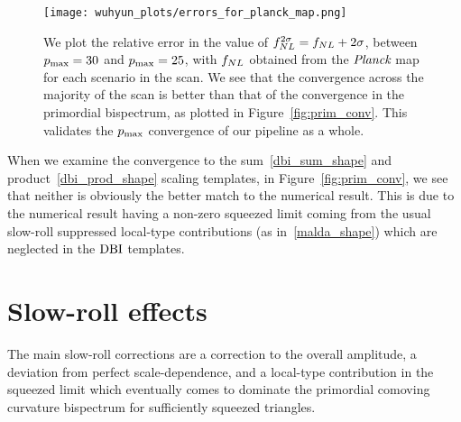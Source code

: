 \begin{figure}[h!]
\centering
\texttt{[image: wuhyun\_plots/errors\_for\_planck\_map.png]}
\caption{
    We plot the relative error in the value of $f_{NL}^{2\sigma}=f_{NL}+2\sigma$,
    between $p_\text{max}=30$ and $p_\text{max}=25$,
    with $f_{NL}$ obtained from the $\textit{Planck}$ map for each scenario in the scan.
    We see that the convergence across the majority of the scan is better than that of the
    convergence in the primordial bispectrum, as plotted in Figure~\ref{fig:prim_conv}.
    This validates the $p_\text{max}$ convergence of our pipeline as a whole.
}\label{fig:cmb_conv}
\end{figure}


    When we examine the convergence to the sum~\eqref{dbi_sum_shape}
    and product~\eqref{dbi_prod_shape} scaling templates,
    in Figure~\ref{fig:prim_conv},
    we see that neither is obviously the better match to the numerical result.
    This is due to the numerical result having a non-zero squeezed limit
    coming from the usual slow-roll suppressed local-type contributions
    (as in~\eqref{malda_shape}) which are neglected in the $\text{DBI}$ templates.




\section{Slow-roll effects}
    The main slow-roll corrections are a correction to the overall amplitude,
    a deviation from perfect scale-dependence,
    and a local-type contribution in the squeezed limit which eventually comes to dominate
    the primordial comoving curvature bispectrum
    for sufficiently squeezed triangles.



